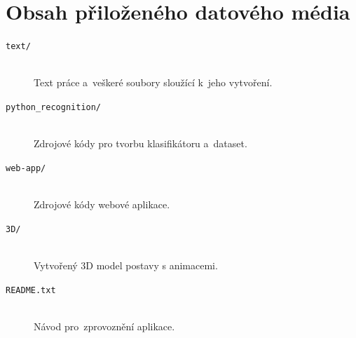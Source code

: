 \documentclass[
  master,
  program=ainfvs,
  biblatex,
  figures=true,
  tables=false,
  sourcecodes=true,
  glossaries,
  index
]{kidiplom}
\begin{document}
\appendix


\section{Obsah přiloženého datového média} \label{sec:ObsahData}

\begin{description}

    \item[\texttt{text/}] \hfill \\
        Text práce a~veškeré soubory sloužící k~jeho vytvoření.
    
    \item[\texttt{python\_recognition/}] \hfill \\
        Zdrojové kódy pro tvorbu klasifikátoru a~dataset.
    
    \item[\texttt{web-app/}] \hfill \\
        Zdrojové kódy webové aplikace.
    
    \item[\texttt{3D/}] \hfill \\
        Vytvořený 3D model postavy s animacemi.
    
    \item[\texttt{README.txt}] \hfill \\ 
        Návod pro~zprovoznění aplikace.
   

\end{description}


\nocite{*}
\printbibliography
\end{document}
